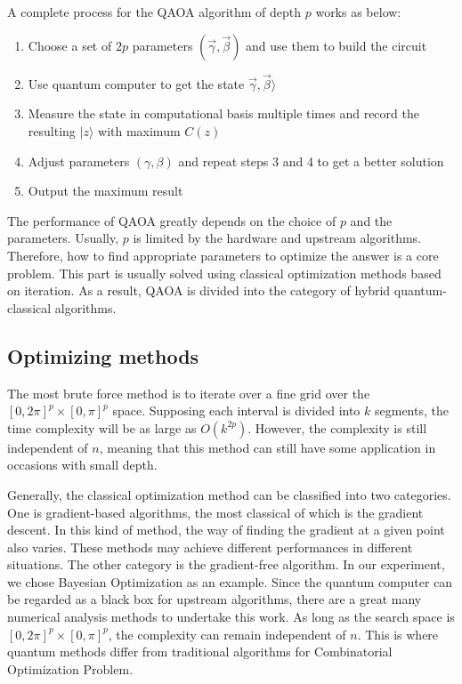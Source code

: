 \documentclass{./source/Report}
\begin{document}
A complete process for the QAOA algorithm of depth $p$ works as below:

\begin{enumerate}
    \item Choose a set of $2p$ parameters $(\vec{\gamma}, \vec{\beta})$ and use them to build the circuit
    \item Use quantum computer to get the state $\vec{\gamma}, \vec{\beta}\rangle$
    \item Measure the state in computational basis multiple times and record the resulting $|z\rangle$ with maximum $C(z)$ 
    \item Adjust parameters $(\gamma, \beta)$ and repeat steps 3 and 4 to get a better solution
    \item Output the maximum result
\end{enumerate}

The performance of QAOA greatly depends on the choice of $p$ and the parameters. Usually, $p$ is limited 
by the hardware and upstream algorithms. Therefore, how to find appropriate parameters to optimize the answer is a core problem.
This part is usually solved using classical optimization methods based on iteration. 
As a result, QAOA is divided into the category of hybrid quantum-classical algorithms.

\subsection{Optimizing methods}

The most brute force method is  to iterate over a fine grid over the $[0, 2\pi]^p \times [0, \pi]^p$
space. Supposing each interval is divided into $k$ segments, the time complexity will be as large as 
$O(k^{2p})$. However, the complexity is still independent of $n$, meaning that this method can still 
have some application in occasions with small depth.

Generally, the classical optimization method can be classified into two categories. 
One is gradient-based algorithms, the most classical of which is the gradient descent. 
In this kind of method, the way of finding the gradient at a given point also varies. These methods
may achieve different performances in different situations. The other category is the gradient-free algorithm.
In our experiment, we chose Bayesian Optimization as an example. Since the quantum computer 
can be regarded as a black box for upstream algorithms, there are a great many numerical analysis methods 
to undertake this work. As long as the search space is $[0, 2\pi]^p \times [0, \pi]^p$, the complexity 
can remain independent of $n$. This is where quantum methods differ from traditional algorithms for Combinatorial Optimization Problem.
\end{document}
